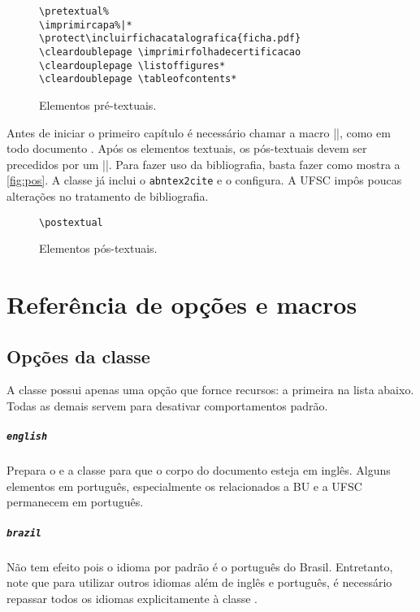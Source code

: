 \documentclass[embeddedlogo]{../ufsc-thesis-rn46-2019}
\begin{document}
\begin{figure}[tb]
  \centering
  \caption{Elementos pré-textuais.}
  \label{fig:pre}
  \begin{verbatim}
\pretextual%
\imprimircapa%|*
\protect\incluirfichacatalografica{ficha.pdf}
\cleardoublepage \imprimirfolhadecertificacao
\cleardouplepage \listoffigures*
\cleardoublepage \tableofcontents*
  \end{verbatim}
\end{figure}

Antes de iniciar o primeiro capítulo é necessário chamar a macro \mt|\textual|,
como em todo documento \abnTeX. Após os elementos textuais, os pós-textuais
devem ser precedidos por um \mt|\postextual|. Para fazer uso da bibliografia,
basta fazer como mostra a \autoref{fig:pos}. A classe já inclui o
\texttt{abntex2cite} e o configura. A UFSC impôs poucas alterações no
tratamento de bibliografia.

\begin{figure}[tb]
  \centering
  \caption{Elementos pós-textuais.}
  \label{fig:pos}
  \begin{verbatim}
\postextual

  \end{verbatim}
\end{figure}

\chapter{Referência de opções e macros}
\label{ch:ref}

\section{Opções da classe}

A classe possui apenas uma opção que fornce recursos: a primeira na lista
abaixo. Todas as demais servem para desativar comportamentos padrão.

\paragraph*{\texttt{english}} Prepara o \abnTeX{} e a classe para que o corpo
do documento esteja em inglês. Alguns elementos em português, especialmente os
relacionados a BU e a UFSC permanecem em português.

\paragraph*{\texttt{brazil}} Não tem efeito pois o idioma por padrão é o
português do Brasil. Entretanto, note que para utilizar outros idiomas além de
inglês e português, é necessário repassar todos os idiomas explicitamente à
classe \abnTeX.
\end{document}
